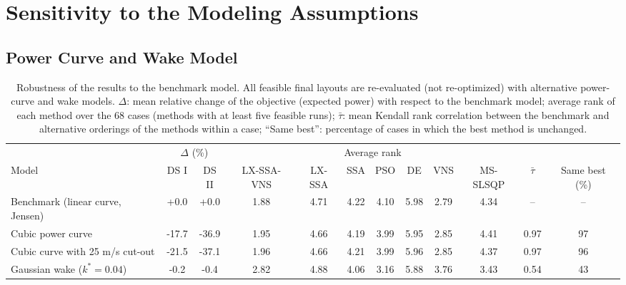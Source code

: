 \documentclass[journal,twoside]{IEEEtran}
\begin{document}
\section{Sensitivity to the Modeling Assumptions}
\label{sec:robustness}
\subsection{Power Curve and Wake Model}
\label{sec:powercurve}
\label{sec:gaussian}
\begin{table}[!t]
\centering
\caption{Robustness of the results to the benchmark model. All feasible final layouts are re-evaluated (not re-optimized) with alternative power-curve and wake models. $\Delta$: mean relative change of the objective (expected power) with respect to the benchmark model; average rank of each method over the 68 cases (methods with at least five feasible runs); $\bar\tau$: mean Kendall rank correlation between the benchmark and alternative orderings of the methods within a case; ``Same best'': percentage of cases in which the best method is unchanged.}
\label{tab:robust-final}
\scriptsize\setlength{\tabcolsep}{3pt}
\begin{tabular}{lccccccccccc}
\toprule
& \multicolumn{2}{c}{$\Delta$ (\%)} & \multicolumn{7}{c}{Average rank} & & \\
\cmidrule(lr){2-3}\cmidrule(lr){4-10}
Model & DS I & DS II & LX-SSA-VNS & LX-SSA & SSA & PSO & DE & VNS & MS-SLSQP & $\bar\tau$ & Same best (\%) \\
\midrule
Benchmark (linear curve, Jensen) & +0.0 & +0.0 & 1.88 & 4.71 & 4.22 & 4.10 & 5.98 & 2.79 & 4.34 & -- & -- \\
Cubic power curve & -17.7 & -36.9 & 1.95 & 4.66 & 4.19 & 3.99 & 5.95 & 2.85 & 4.41 & 0.97 & 97 \\
Cubic curve with 25 m/s cut-out & -21.5 & -37.1 & 1.96 & 4.66 & 4.21 & 3.99 & 5.96 & 2.85 & 4.37 & 0.97 & 96 \\
Gaussian wake ($k^*=0.04$) & -0.2 & -0.4 & 2.82 & 4.88 & 4.06 & 3.16 & 5.88 & 3.76 & 3.43 & 0.54 & 43 \\
\bottomrule
\end{tabular}
\end{table}
\end{document}
